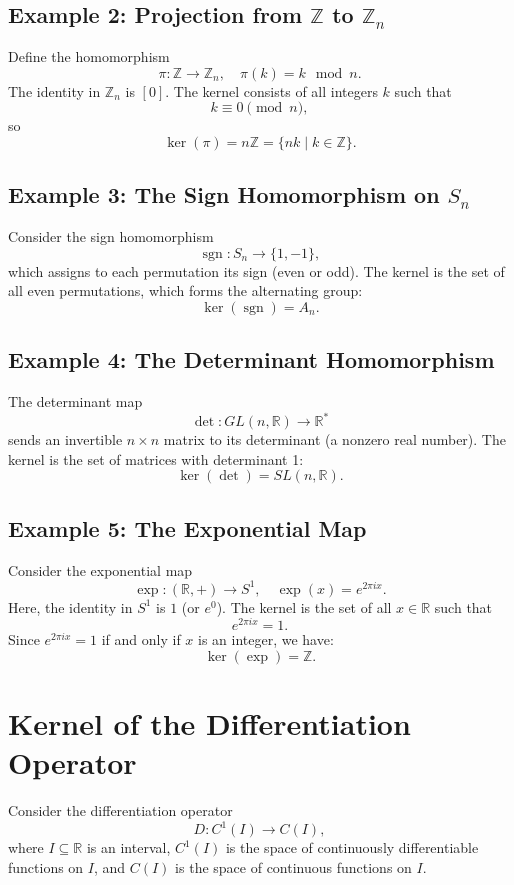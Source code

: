\documentclass[12pt]{article}
\theoremstyle{definition} %
\theoremstyle{plain} %
\begin{document}
\subsection*{Example 2: Projection from \(\mathbb{Z}\) to \(\mathbb{Z}_n\)}
Define the homomorphism
\[
\pi: \mathbb{Z} \to \mathbb{Z}_n, \quad \pi(k) = k \mod n.
\]
The identity in \(\mathbb{Z}_n\) is \([0]\). The kernel consists of all integers \(k\) such that
\[
k \equiv 0 \pmod{n},
\]
so
\[
\ker(\pi) = n\mathbb{Z} = \{ nk \mid k \in \mathbb{Z} \}.
\]

\subsection*{Example 3: The Sign Homomorphism on \(S_n\)}
Consider the sign homomorphism
\[
\operatorname{sgn}: S_n \to \{1, -1\},
\]
which assigns to each permutation its sign (even or odd). The kernel is the set of all even permutations, which forms the alternating group:
\[
\ker(\operatorname{sgn}) = A_n.
\]

\subsection*{Example 4: The Determinant Homomorphism}
The determinant map
\[
\det: GL(n, \mathbb{R}) \to \mathbb{R}^*
\]
sends an invertible \(n \times n\) matrix to its determinant (a nonzero real number). The kernel is the set of matrices with determinant 1:
\[
\ker(\det) = SL(n, \mathbb{R}).
\]

\subsection*{Example 5: The Exponential Map}
Consider the exponential map
\[
\exp: (\mathbb{R}, +) \to S^1, \quad \exp(x) = e^{2\pi i x}.
\]
Here, the identity in \(S^1\) is \(1\) (or \(e^{0}\)). The kernel is the set of all \(x \in \mathbb{R}\) such that
\[
e^{2\pi i x} = 1.
\]
Since \(e^{2\pi i x} = 1\) if and only if \(x\) is an integer, we have:
\[
\ker(\exp) = \mathbb{Z}.
\]

\section*{Kernel of the Differentiation Operator}

Consider the differentiation operator
\[
D: C^1(I) \to C(I),
\]
where \(I \subseteq \mathbb{R}\) is an interval, \(C^1(I)\) is the space of continuously differentiable functions on \(I\), and \(C(I)\) is the space of continuous functions on \(I\).
\end{document}

